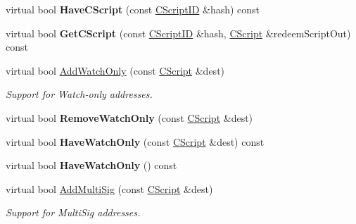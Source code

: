 \begin{DoxyCompactItemize}
\mbox{\label{class_c_basic_key_store_a499e0a1d117b43e3200883d88a400bf6}} 
virtual bool {\bfseries Have\+C\+Script} (const \mbox{\hyperlink{class_c_script_i_d}{C\+Script\+ID}} \&hash) const
\item 
\mbox{\label{class_c_basic_key_store_a975abe0f2efa3e0e2270d3714d73010a}} 
virtual bool {\bfseries Get\+C\+Script} (const \mbox{\hyperlink{class_c_script_i_d}{C\+Script\+ID}} \&hash, \mbox{\hyperlink{class_c_script}{C\+Script}} \&redeem\+Script\+Out) const
\item 
\mbox{\label{class_c_basic_key_store_a2417d0ae4e654c88cf47a1ba5f71b5a3}} 
virtual bool \mbox{\hyperlink{class_c_basic_key_store_a2417d0ae4e654c88cf47a1ba5f71b5a3}{Add\+Watch\+Only}} (const \mbox{\hyperlink{class_c_script}{C\+Script}} \&dest)
\begin{DoxyCompactList}\small\item\em Support for Watch-\/only addresses. \end{DoxyCompactList}\item 
\mbox{\label{class_c_basic_key_store_a20c0eccf943d6d16e24c6e2fb63fb527}} 
virtual bool {\bfseries Remove\+Watch\+Only} (const \mbox{\hyperlink{class_c_script}{C\+Script}} \&dest)
\item 
\mbox{\label{class_c_basic_key_store_a3ce143be2a1d3e752972614cf7fb7efb}} 
virtual bool {\bfseries Have\+Watch\+Only} (const \mbox{\hyperlink{class_c_script}{C\+Script}} \&dest) const
\item 
\mbox{\label{class_c_basic_key_store_aa6686d4477a180096436e7d491142f10}} 
virtual bool {\bfseries Have\+Watch\+Only} () const
\item 
\mbox{\label{class_c_basic_key_store_aabf67b3fe93f6d3520e1a6d133827f31}} 
virtual bool \mbox{\hyperlink{class_c_basic_key_store_aabf67b3fe93f6d3520e1a6d133827f31}{Add\+Multi\+Sig}} (const \mbox{\hyperlink{class_c_script}{C\+Script}} \&dest)
\begin{DoxyCompactList}\small\item\em Support for Multi\+Sig addresses. \end{DoxyCompactList}\item 

\end{DoxyCompactItemize}
